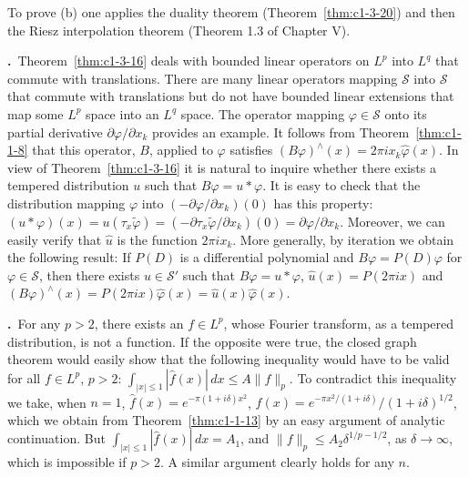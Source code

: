 To prove (b) one applies the duality theorem (Theorem~\ref{thm:c1-3-20}) and
then the Riesz interpolation theorem (Theorem 1.3 of Chapter V).

\label{eq:c1-4-12}\textbf{\theequation.}~Theorem~\ref{thm:c1-3-16}
deals with bounded linear operators on $L^{p}$ into $L^{q}$ that commute with
translations. There are many linear operators mapping $\mathscr{S}$ into
$\mathscr{S}$ that commute with translations but do not have bounded linear
extensions that map some $L^{p}$ space into an $L^{q}$ space. The operator
mapping $\varphi \in \mathscr{S}$ onto its partial derivative
$\partial\varphi/\partial x_{k}$ provides an example. It follows from
Theorem~\ref{thm:c1-1-8} that this operator, $B$, applied to $\varphi$
satisfies $(B\varphi)^{\wedge}(x) = 2\pi i x_{k}\hat{\varphi}(x)$. In view of
Theorem~\ref{thm:c1-3-16} it is natural to inquire whether there exists a
tempered distribution $u$ such that $B\varphi = u * \varphi$. It is easy to
check that the distribution mapping $\varphi$ into
$(-\partial\varphi/\partial x_{k})(0)$ has this property:
$(u * \varphi)(x) = u(\tau_{x}\tilde{\varphi}) = (-\partial\tau_{x}\tilde{\varphi}/\partial x_{k})(0) = \partial\varphi/\partial x_{k}$.
Moreover, we can easily verify that $\hat{u}$ is the function $2\pi i x_{k}$.
More generally, by iteration we obtain the following result: If $P(D)$ is a
differential polynomial and $B\varphi = P(D)\varphi$ for
$\varphi \in \mathscr{S}$, then there exists $u \in \mathscr{S}'$ such that
$B\varphi = u * \varphi$, $\hat{u}(x) = P(2\pi ix)$ and
$(B\varphi)^{\wedge}(x) = P(2\pi ix)\hat{\varphi}(x) = \hat{u}(x)\hat{\varphi}(x)$.

\label{eq:c1-4-13}\textbf{\theequation.}~For any
$p > 2$, there exists an $f \in L^{p}$, whose Fourier transform, as a tempered
distribution, is not a function. If the opposite were true, the closed graph
theorem would easily show that the following inequality would have to be valid
for all $f \in L^{p}$, $p > 2$:
$\int_{|x| \leq 1} |\hat{f}(x)| \, dx \leq A\|f\|_{p}$. To contradict this
inequality we take, when $n = 1$, $\hat{f}(x) = e^{-\pi(1 + i\delta)x^{2}}$,
$f(x) = e^{-\pi x^{2}/(1 + i\delta)}/(1 + i\delta)^{1/2}$, which we obtain from
Theorem~\ref{thm:c1-1-13} by an easy argument of analytic continuation. But
$\int_{|x| \leq 1} |\hat{f}(x)| \, dx = A_{1}$, and
$\|f\|_{p} \leq A_{2}\delta^{1/p - 1/2}$, as $\delta \to \infty$, which is
impossible if $p > 2$. A similar argument clearly holds for any $n$.

